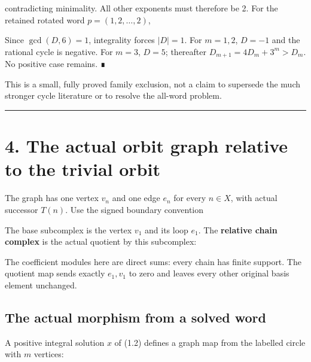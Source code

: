 
contradicting minimality. All other exponents must therefore be 2. For
the retained rotated word \(p=(1,2,\ldots,2)\),


Since \(\gcd(D,6)=1\), integrality forces \(|D|=1\). For \(m=1,2\),
\(D=-1\) and the rational cycle is negative. For \(m=3\), \(D=5\);
thereafter \(D_{m+1}=4D_m+3^m> D_m\). No positive case remains. ∎

This is a small, fully proved family exclusion, not a claim to supersede
the much stronger cycle literature or to resolve the all-word problem.

\begin{center}\rule{0.5\linewidth}{0.5pt}\end{center}

\section{4. The actual orbit graph relative to the trivial orbit}

The graph has one vertex \(v_n\) and one edge \(e_n\) for every
\(n\in X\), with actual successor \(T(n)\). Use the signed boundary
convention


The base subcomplex is the vertex \(v_1\) and its loop \(e_1\). The
\textbf{relative chain complex} is the actual quotient by this
subcomplex:


The coefficient modules here are direct sums: every chain has finite
support. The quotient map sends exactly \(e_1,v_1\) to zero and leaves
every other original basis element unchanged.

\subsection{The actual morphism from a solved word}

A positive integral solution \(x\) of (1.2) defines a graph map from the
labelled circle with \(m\) vertices:


